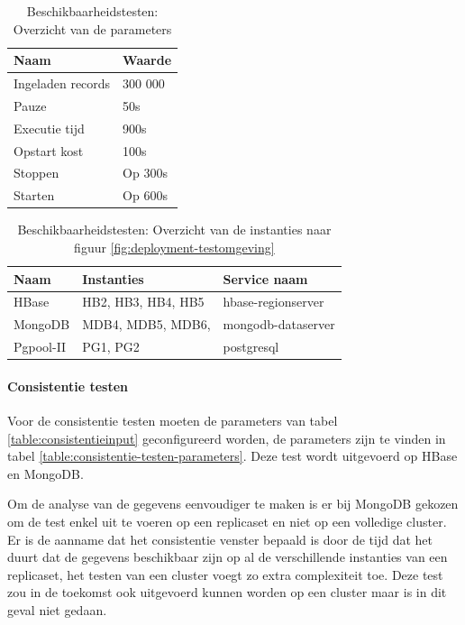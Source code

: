 \begin{table}[ht!]
	\centering
	\begin{tabular}{l| l }
		\textbf{Naam} & \textbf{Waarde}  \\
		\hline
		Ingeladen records  & 300 000 \\
		Pauze & 50s \\
		Executie tijd & 900s \\
		Opstart kost & 100s \\
		Stoppen & Op 300s \\
		Starten & Op 600s \\
	\end{tabular}
	\caption{Beschikbaarheidstesten: Overzicht van de parameters}
	\label{table:beschikbaarheidstesten-parameters}
\end{table}


\begin{table}[ht!]
	\centering
	\begin{tabular}{l| l l }
		\textbf{Naam} & \textbf{Instanties} & \textbf{Service naam} \\
		\hline
		HBase  & HB2, HB3, HB4, HB5 & hbase-regionserver \\
		MongoDB  & MDB4, MDB5, MDB6, & mongodb-dataserver\\
		Pgpool-II  & PG1, PG2 & postgresql \\
	\end{tabular}
	\caption{Beschikbaarheidstesten: Overzicht van de instanties naar figuur \ref{fig:deployment-testomgeving}}
	\label{table:beschikbaarheidstesten-nodes}
\end{table}

\paragraph{Consistentie testen} Voor de consistentie testen moeten de parameters van tabel \ref{table:consistentieinput} geconfigureerd worden, de parameters zijn te vinden in tabel \ref{table:consistentie-testen-parameters}. Deze test wordt uitgevoerd op HBase en MongoDB. 

Om de analyse van de gegevens eenvoudiger te maken is er bij MongoDB gekozen om de test enkel uit te voeren op een replicaset en niet op een volledige cluster. Er is de aanname dat het consistentie venster bepaald is door de tijd dat het duurt dat de gegevens beschikbaar zijn op al de verschillende instanties van een replicaset, het testen van een cluster voegt zo extra complexiteit toe. Deze test zou in de toekomst ook uitgevoerd kunnen worden op een cluster maar is in dit geval niet gedaan.  

